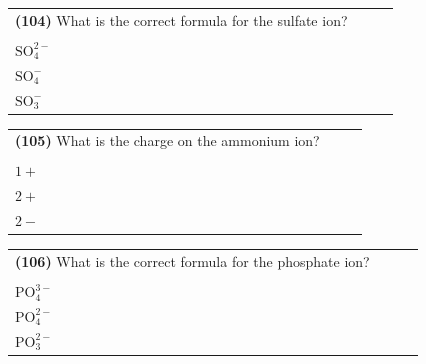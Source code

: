 \documentclass{article}
\begin{document}
\vspace{0.2cm}
\noindent
\begin{tabular}{|p{0.9\linewidth}|}
\hline
\vspace{0.2cm}
\textbf{(104)} What is the correct formula for the sulfate ion? \\
\begin{minipage}[t]{0.85\linewidth}
\begin{enumerate}[label=\alph*.]
\item $\text{SO}_3^{2-}$ \\
\item $\text{SO}_4^{2-}$ \\
\item $\text{SO}_4^{-}$ \\
\item $\text{SO}_3^{-}$ 
\end{enumerate}
\end{minipage}\\
\hline
\end{tabular}

\vspace{0.2cm}
\noindent
\begin{tabular}{|p{0.9\linewidth}|}
\hline
\vspace{0.2cm}
\textbf{(105)} What is the charge on the ammonium ion? \\
\begin{minipage}[t]{0.85\linewidth}
\begin{enumerate}[label=\alph*.]
\item $1-$ \\
\item $1+$ \\
\item $2+$ \\
\item $2-$
\end{enumerate}
\end{minipage}\\
\hline
\end{tabular}

\vspace{0.2cm}
\noindent
\begin{tabular}{|p{0.9\linewidth}|}
\hline
\vspace{0.2cm}
\textbf{(106)} What is the correct formula for the phosphate ion? \\
\begin{minipage}[t]{0.85\linewidth}
\begin{enumerate}[label=\alph*.]
\item $\text{PO}_3^{3-}$ \\
\item $\text{PO}_4^{3-}$ \\
\item $\text{PO}_4^{2-}$ \\
\item $\text{PO}_3^{2-}$
\end{enumerate}
\end{minipage}\\
\hline
\end{tabular}
\end{document}
